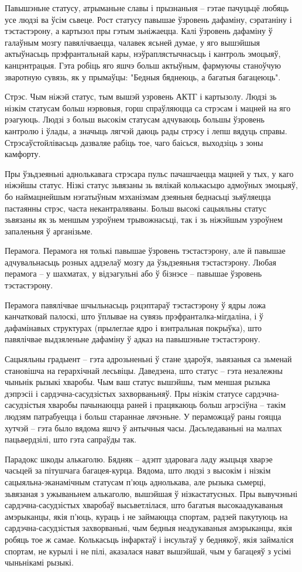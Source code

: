 Павышэньне статусу, атрыманьне славы і прызнаньня – гэтае пачуцьцё любяць усе людзі ва ўсім сьвеце. Рост статусу павышае ўзровень дафаміну, сэратаніну і тэстастэрону, а картызол пры гэтым зьніжаецца. Калі ўзровень дафаміну ў галаўным мозгу павялічваецца, чалавек ясьней думае, у яго вышэйшыя актыўнасьць прэфрантальнай кары, нэўраплястычнасьць і кантроль эмоцыяў, канцэнтрацыя. Гэта робіць яго яшчэ больш актыўным, фармуючы станоўчую зваротную сувязь, як у прымаўцы: "Бедныя бяднеюць, а багатыя багацеюць".

Стрэс. Чым ніжэй статус, тым вышэй узровень АКТГ і картызолу. Людзі зь нізкім статусам больш нэрвовыя, горш спраўляюцца са стрэсам і мацней на яго рэагуюць. Людзі з больш высокім статусам адчуваюць большы ўзровень кантролю і ўлады, а значыць лягчэй даюць рады стрэсу і лепш вядуць справы. Стрэсаўстойлівасьць дазваляе рабіць тое, чаго баісься, выходзіць з зоны камфорту.

Пры ўзьдзеяньні аднолькавага стрэсара пульс пачашчаецца мацней у тых, у каго ніжэйшы статус. Нізкі статус зьвязаны зь вялікай колькасьцю адмоўных эмоцыяў, бо наймацнейшым нэгатыўным мэханізмам дзеяньня беднасьці зьяўляецца пастаянны стрэс, часта некантраляваны. Больш высокі сацыяльны статус зьвязаны як зь меншым узроўнем трывожнасьці, так і зь ніжэйшым узроўнем запаленьня ў арганізьме.

Перамога. Перамога ня толькі павышае ўзровень тэстастэрону, але й павышае адчувальнасьць розных аддзелаў мозгу да ўзьдзеяньня тэстастэрону. Любая перамога – у шахматах, у відэагульні або ў бізнэсе – павышае ўзровень тэстастэрону. 

Перамога павялічвае шчыльнасьць рэцэптараў тэстастэрону ў ядры ложа канчатковай палоскі, што ўплывае на сувязь прэфранталка-мігдаліна, і ў дафамінавых структурах (прылеглае ядро і вэнтральная покрыўка), што павялічвае выдзяленьне дафаміну ў адказ на павышэньне тэстастэрону.

Сацыяльны градыент – гэта адрозьненьні ў стане здароўя, зьвязаныя са зьменай становішча на герархічнай лесьвіцы. Даведзена, што статус – гэта незалежны чыньнік рызыкі хваробы. Чым ваш статус вышэйшы, тым меншая рызыка дэпрэсіі і сардэчна-сасудзістых захворваньняў. Пры нізкім статусе сардэчна-сасудзістыя хваробы пачынаюцца раней і працякаюць больш агрэсіўна – такім людзям патрабуецца і больш стараннае лячэньне. У пераможцаў раны гояцца хутчэй – гэта было вядома яшчэ ў антычныя часы. Дасьледаваньні на малпах пацьвердзілі, што гэта сапраўды так.

Парадокс шкоды алькаголю. Бядняк – адэпт здаровага ладу жыцьця хварэе часьцей за пітушчага багацея-курца. Вядома, што людзі з высокім і нізкім сацыяльна-эканамічным статусам п'юць аднолькава, але рызыка сьмерці, зьвязаная з ужываньнем алькаголю, вышэйшая ў нізкастатусных. Пры вывучэньні сардэчна-сасудзістых хваробаў высьветлілася, што багатыя высокаадукаваныя амэрыканцы, якія п'юць, кураць і не займаюцца спортам, радзей пакутуюць на сардэчна-сасудзістыя захворваньні, чым бедныя неадукаваныя амэрыканцы, якія робяць тое ж самае. Колькасьць інфарктаў і інсультаў у беднякоў, якія займаліся спортам, не курылі і не пілі, аказалася нават вышэйшай, чым у багацеяў з усімі чыньнікамі рызыкі.

